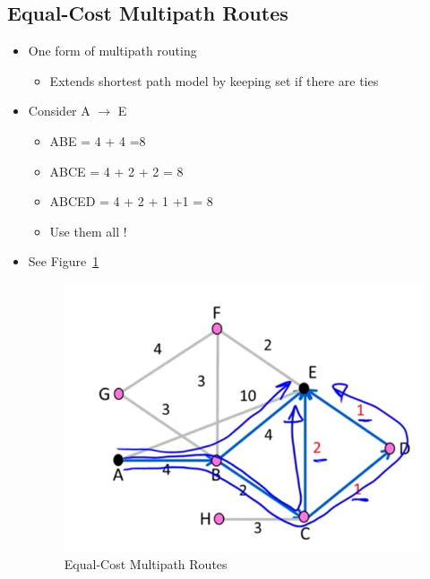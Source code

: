 \documentclass[12pt]{ctexart}   %
\begin{document}
	\subsection{Equal-Cost Multipath Routes}
	\begin{itemize}
		\item One form of multipath routing
		\begin{itemize}
			\item Extends shortest path model by keeping set if there are ties
		\end{itemize}
		
		\item Consider A $\rightarrow$ E
		\begin{itemize}
			\item ABE = 4 + 4 =8
			\item ABCE = 4 + 2 + 2 = 8
			\item ABCED = 4 + 2 + 1 +1 = 8
			\item Use them all !
		\end{itemize}
		\item See Figure~\ref{fig:5-7-2}
			
		\begin{figure}[h!] %
		\centering
		 \includegraphics[scale=0.7]{images/5-7-2}
		\caption{ Equal-Cost Multipath Routes }
		 \label{fig:5-7-2}
		 \end{figure}
	\end{itemize}
	
\end{document}
